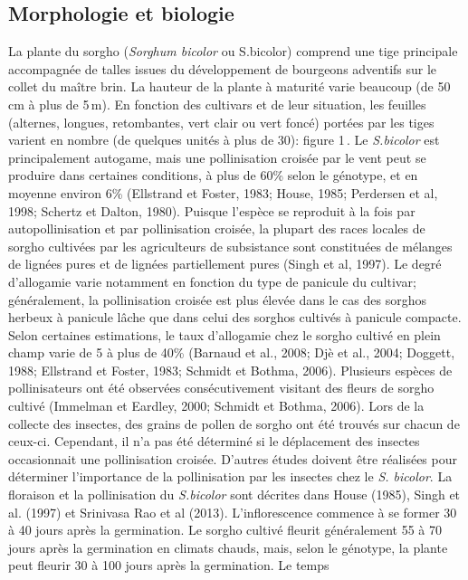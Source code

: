 \documentclass[a4paper,11pt]{article}
\begin{document}
 
\subsection{Morphologie et biologie} La plante du sorgho
(\emph{Sorghum bicolor} ou S.bicolor) comprend une tige principale
accompagnée de talles issues du développement de bourgeons adventifs
sur le collet du maître brin. La hauteur de la plante à maturité varie
beaucoup (de 50\,cm à plus de 5\,m). En fonction des cultivars et de
leur situation, les feuilles (alternes, longues, retombantes, vert
clair ou vert foncé) portées par les tiges varient en nombre (de
quelques unités à plus de 30): figure 1\,\cite{BARRO_KONDOMBO_2010}. Le
\emph{S.bicolor} est principalement autogame, mais une pollinisation
croisée par le vent peut se produire dans certaines conditions, à plus
de 60\% selon le génotype, et en moyenne environ 6\% (Ellstrand et
Foster, 1983; House, 1985; Perdersen et al, 1998; Schertz et Dalton,
1980). Puisque l’espèce se reproduit à la fois par autopollinisation
et par pollinisation croisée, la plupart des races locales de sorgho
cultivées par les agriculteurs de subsistance sont constituées de
mélanges de lignées pures et de lignées partiellement pures (Singh et
al, 1997). Le degré d’allogamie varie notamment en fonction du type de
panicule du cultivar; généralement, la pollinisation croisée est plus
élevée dans le cas des sorghos herbeux à panicule lâche que dans celui
des sorghos cultivés à panicule compacte. Selon certaines estimations,
le taux d’allogamie chez le sorgho cultivé en plein champ varie de 5 à
plus de 40\% (Barnaud et al., 2008; Djè et al., 2004; Doggett, 1988;
Ellstrand et Foster, 1983; Schmidt et Bothma, 2006). Plusieurs espèces
de pollinisateurs ont été observées consécutivement visitant des
fleurs de sorgho cultivé (Immelman et Eardley, 2000; Schmidt et
Bothma, 2006). Lors de la collecte des insectes, des grains de pollen
de sorgho ont été trouvés sur chacun de ceux-ci. Cependant, il n’a pas
été déterminé si le déplacement des insectes occasionnait une
pollinisation croisée. D’autres études doivent être réalisées pour
déterminer l’importance de la pollinisation par les insectes chez le
\emph{S. bicolor}. La floraison et la pollinisation du \emph{S.bicolor} sont
décrites dans House (1985), Singh et al. (1997) et Srinivasa Rao et al
(2013). L’inflorescence commence à se former 30 à 40 jours après la
germination. Le sorgho cultivé fleurit généralement 55 à 70 jours
après la germination en climats chauds, mais, selon le génotype, la
plante peut fleurir 30 à 100 jours après la germination. Le temps
\end{document}
